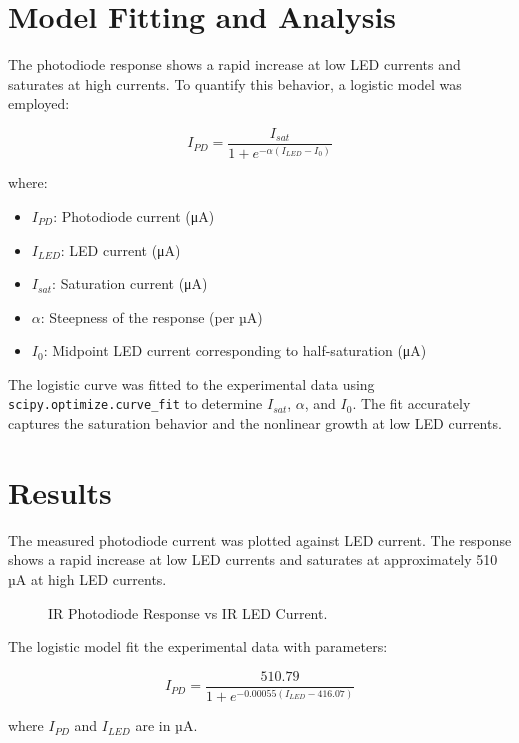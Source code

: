 \documentclass[12pt]{article}
\begin{document}
\newpage
\section{Model Fitting and Analysis}

The photodiode response shows a rapid increase at low LED currents and saturates at high currents. To quantify this behavior, a logistic model was employed:

\[
I_{PD} = \frac{I_{sat}}{1 + e^{-\alpha (I_{LED} - I_0)}}
\]

where:
\begin{itemize}
  \item $I_{PD}$: Photodiode current (\si{\micro\ampere})
  \item $I_{LED}$: LED current (\si{\micro\ampere})
  \item $I_{sat}$: Saturation current (\si{\micro\ampere})
  \item $\alpha$: Steepness of the response (per µA)
  \item $I_0$: Midpoint LED current corresponding to half-saturation (\si{\micro\ampere})
\end{itemize}

The logistic curve was fitted to the experimental data using \texttt{scipy.optimize.curve\_fit} to determine $I_{sat}$, $\alpha$, and $I_0$. The fit accurately captures the saturation behavior and the nonlinear growth at low LED currents.



\section{Results}

The measured photodiode current was plotted against LED current. The response shows a rapid increase at low LED currents and saturates at approximately 510\,µA at high LED currents.  

\begin{figure}[H]
  \centering
  
  \caption{IR Photodiode Response vs IR LED Current.}
  \label{fig:IR_PD}
\end{figure}

The logistic model fit the experimental data with parameters:

\[
I_{PD} = \frac{510.79}{1 + e^{-0.00055 (I_{LED} - 416.07)}}
\]

where $I_{PD}$ and $I_{LED}$ are in µA.
\end{document}
